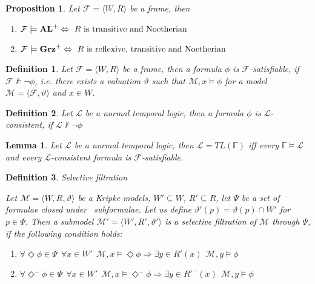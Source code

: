 \documentclass[a4paper]{article}
\theoremstyle{defin}
\newtheorem{defin}{Definition}
\theoremstyle{theorem}
\theoremstyle{prop}
\newtheorem{prop}{Proposition}
\theoremstyle{lemma}
\newtheorem{lemma}{Lemma}
\theoremstyle{ex}
\theoremstyle{col}
\newcommand{\DiamondM}{\Diamond^{-}}
\begin{document}
\begin{prop} Let $\mathcal{F} = \langle W, R \rangle$ be a frame, then

  \begin{enumerate}
    \item $\mathcal{F} \models {\bf AL}^{+} \Leftrightarrow \text{ $R$ is transitive and Noetherian}$
    \item $\mathcal{F} \models {\bf Grz}^{+} \Leftrightarrow \text{ $R$ is reflexive, transitive and Noetherian}$
  \end{enumerate}
\end{prop}

\begin{defin}
  Let $\mathcal{F} = \langle W, R \rangle$ be a frame, then a formula $\phi$ is $\mathcal{F}$-satisfiable, if $\mathcal{F} \nvDash \neg \phi$, i.e. there exists a valuation $\vartheta$ such that $\mathcal{M}, x \models \phi$ for a model $\mathcal{M} = \langle \mathcal{F}, \vartheta \rangle$ and $x \in W$.
\end{defin}

\begin{defin}
  Let $\mathcal{L}$ be a normal temporal logic, then a formula $\phi$ is $\mathcal{L}$-consistent, if $\mathcal{L} \nvdash \neg \phi$
\end{defin}

\begin{lemma}
  Let $\mathcal{L}$ be a normal temporal logic, then $\mathcal{L} = TL(\mathbb{F})$ iff every $\mathbb{F} \models \mathcal{L}$ and every $\mathcal{L}$-consistent
  formula is $\mathcal{F}$-satisfiable.
\end{lemma}

\begin{defin} Selective filtration

  Let $\mathcal{M} = \langle W, R, \vartheta \rangle$ be a Kripke models, $W' \subseteq W$, $R' \subseteq R$, let $\Psi$ be a set of formulae closed under \
  subformulae. Let us define $\vartheta'(p) = \vartheta(p) \cap W'$ for $p \in \Psi$. Then a submodel $\mathcal{M}' = \langle W', R', \vartheta' \rangle$ is a
  selective filtration of $\mathcal{M}$ through $\Psi$, if the following condition holds:

  \begin{enumerate}
    \item $\forall \Diamond \phi \in \Psi \:\: \forall x \in W' \:\: \mathcal{M}, x \models \Diamond \phi \Rightarrow \exists y \in R'(x) \:\: \mathcal{M}, y \models \phi$
    \item $\forall \DiamondM \phi \in \Psi \:\: \forall x \in W' \:\: \mathcal{M}, x \models \DiamondM \phi \Rightarrow \exists y \in R'^{-}(x) \:\: \mathcal{M}, y \models \phi$
  \end{enumerate}
\end{defin}
\end{document}

